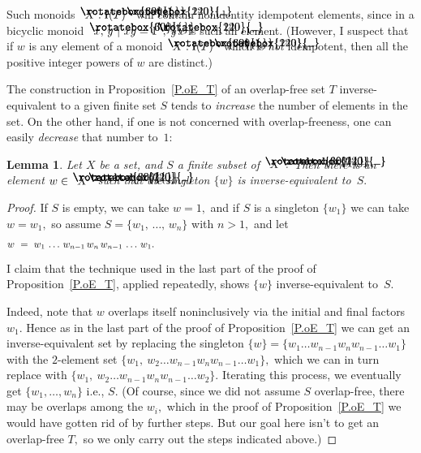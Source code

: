 \documentclass{amsart}
\newtheorem{lemma}[equation]{Lemma}
\numberwithin{equation}{section}
\newcommand{\I}{\mathbf{i}\hspace{.05em}}
\newcommand{\langl}{\begin{picture}(.51em,1em)
\put(.11em,.33em){\rotatebox{60}{\line(1,0){.55em}}}
\put(.11em,.33em){\rotatebox{300}{\line(1,0){.55em}}}
\end{picture}}
\newcommand{\rangl}{\begin{picture}(.5em,1em)
\put(.09em,.33em){\rotatebox{120}{\line(1,0){.55em}}}
\put(.09em,.33em){\rotatebox{240}{\line(1,0){.55em}}}
\end{picture}}
\begin{document}
Such monoids $\langl X:\I(T)\rangl$
will contain nonidentity idempotent elements,
since in a bicyclic monoid $\langl x,\,y~|~xy=1\rangl,$
$y\,x$ is such an element.
(However, I suspect that if $w$ is any element of a monoid
$\langl X:\I(T)\rangl$ which is {\em not} idempotent, then all the
positive integer powers of $w$ are distinct.)

The construction in Proposition~\ref{P.oE_T} of an
overlap-free set $T$ inverse-equivalent to a given finite
set $S$ tends to {\em increase} the number of elements in the set.
On the other hand, if one is not concerned with overlap-freeness,
one can easily {\em decrease} that number to~$1\!:$

\begin{lemma}\label{L.1-elt}
Let $X$ be a set, and $S$ a finite subset of $\langl X\rangl.$
Then there is an element $w\in \langl X\rangl$ such
that the singleton $\{w\}$ is inverse-equivalent to~$S.$
\end{lemma}

\begin{proof}
If $S$ is empty, we can take $w=1,$ and if $S$ is
a singleton $\{w_1\}$ we can take $w=w_1,$ so assume
$S=\{w_1,\,\dots,\,w_n\}$ with $n>1,$ and let
%
\begin{equation}\begin{minipage}[c]{35pc}\label{d.w=}
$w \ = \ %
w_1\,\dots\,w_{n-1}\,w_n\,w_{n-1}\,\dots\,w_1.$
\end{minipage}\end{equation}
%
I claim that the technique used in
the last part of the proof of Proposition~\ref{P.oE_T},
applied repeatedly, shows $\{w\}$ inverse-equivalent to~$S.$

Indeed, note that $w$ overlaps itself
noninclusively via the initial and final factors $w_1.$
Hence as in the last part of the proof of Proposition~\ref{P.oE_T}
we can get an inverse-equivalent set by replacing the
singleton $\{w\}=\{w_1\dots w_{n-1} w_n w_{n-1}\dots w_1\}$
with the $\!2\!$-element set
$\{w_1,\ w_2\dots w_{n-1} w_n w_{n-1}\dots w_1\},$
which we can in turn replace with
$\{w_1,\ w_2\dots w_{n-1} w_n w_{n-1}\dots w_2\}.$
Iterating this process, we eventually get $\{w_1,\dots,w_n\}$
i.e., $S.$
(Of course, since we did not assume $S$ overlap-free,
there may be overlaps among the $w_i,$ which in the proof
of Proposition~\ref{P.oE_T} we would have
gotten rid of by further steps.
But our goal here isn't to get an overlap-free $T,$
so we only carry out the steps indicated above.)
\end{proof}
\end{document}
